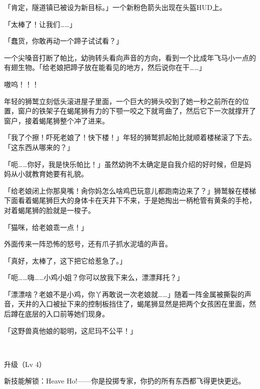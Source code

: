 「{\mtzh 肯定，隧道镇已被设为新目标。}」一个新粉色箭头出现在头盔HUD上。

「太棒了！让我们……」

「蠢货，你敢再动一个蹄子试试看？」

一个尖嗓音打断了帕比，幼驹转头看向声音的方向，看到一个比成年飞马小一点的有翅生物。「给老娘把蹄子放在能看见的地方，然后说你在干……」

嗷呜！！！

年轻的狮鹫立刻低头滚进屋子里面，一个巨大的狮头咬到了她一秒之前所在的位置，窗户的铁架子在蝎尾狮有力的下颚一咬之下就弯曲了，然后它下一次就撑开了窗户，接着蝎尾狮整个冲了进来。

「我了个擦！吓死老娘了！快下楼！」年轻的狮鹫抓起帕比就顺着楼梯滚了下去。「这东西从哪来的？」

「呃……你好，我是快乐帕比！」虽然幼驹不太确定是自我介绍的好时候，但是妈妈从小就教育她要有礼貌。

「给老娘闭上你那臭嘴！肏你妈怎么啥鸡巴玩意儿都跑南边来了？」狮鹫躲在楼梯下面看着蝎尾狮巨大的身体卡在天井下不来，于是她掏出一柄枪管有黄条的手枪，对着蝎尾狮的脸就是一梭子。

「猫咪，给老娘乖一点！」

外面传来一阵恐怖的怒号，还有爪子抓水泥墙的声音。

「真好，太棒了，这下把它给惹急了。」

「呃……嗨……小鸡小姐？你可以放我下来么，漂漂拜托？」

「漂漂啥？老娘不是小鸡，你丫再敢说一次老娘就……」随着一阵金属被撕裂的声音，天井的入口被扯下来的控制板挡住了，蝎尾狮显然是把两个女孩困在里面，然后蹲在底层的入口前等她们现身。

「这野兽真他娘的聪明，这尼玛不公平！」

~\vfill

\begin{note}
    升级（Lv 4）

    新技能解锁：Heave Ho!——你是投掷专家，你扔的所有东西都飞得更快更远。
\end{note}



